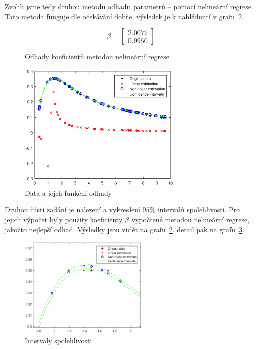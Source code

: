 Zvolili jsme tedy druhou metodu odhadu parametrů – pomocí nelineární regrese.
Tato metoda funguje dle očekávání dobře, výsledek je k nahlédnutí v grafu~\ref{fig:lr2}.

\begin{figure}[htb]
    \centering
    \vspace*{0in}

    \begin{equation*}
        \beta = \left[ \begin{matrix} 2.0077 \\ 0.9950 \end{matrix} \right]
    \end{equation*}

    \label{eq:linear}
    \caption{Odhady koeficientů metodou nelineární regrese}
\end{figure}
\FloatBarrier

\begin{figure}[htb]
    \centering
    \includegraphics[width=0.7\textwidth]{graphs/fig1.eps}
    \caption{Data a jejch funkční odhady}
    \label{fig:lr2}
\end{figure}
\FloatBarrier

Druhou částí zadání je nalezení a vykreslení \( 95 \% \) intervalů spolehlivosti.
Pro jejich výpočet byly použity koeficienty \( \beta \) vypočtené metodou nelineární regrese, jakožto nejlepší odhad.
Výsledky jsou vidět na grafu~\ref{fig:lr2}, detail pak na grafu~\ref{fig:lr3}.

\begin{figure}[htb]
    \centering
    \includegraphics[width=0.55\textwidth]{graphs/fig2.eps}
    \caption{Intervaly spolehlivosti}
    \label{fig:lr3}
\end{figure}
\FloatBarrier

